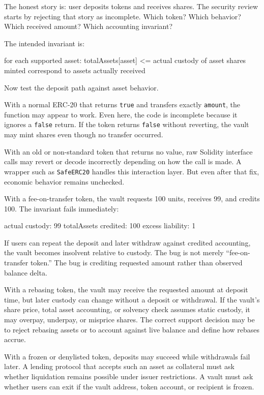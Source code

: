 The honest story is: user deposits tokens and receives shares. The security review starts by rejecting that story as incomplete. Which token? Which behavior? Which received amount? Which accounting invariant?

The intended invariant is:

\begin{codeblock}
for each supported asset:
    totalAssets[asset] <= actual custody of asset
    shares minted correspond to assets actually received
\end{codeblock}

Now test the deposit path against asset behavior.

With a normal ERC-20 that returns \texttt{true} and transfers exactly \texttt{amount}, the function may appear to work. Even here, the code is incomplete because it ignores a \texttt{false} return. If the token returns \texttt{false} without reverting, the vault may mint shares even though no transfer occurred.

With an old or non-standard token that returns no value, raw Solidity interface calls may revert or decode incorrectly depending on how the call is made. A wrapper such as \texttt{SafeERC20} handles this interaction layer. But even after that fix, economic behavior remains unchecked.

With a fee-on-transfer token, the vault requests 100 units, receives 99, and credits 100. The invariant fails immediately:

\begin{codeblock}
actual custody:       99
totalAssets credited: 100
excess liability:      1
\end{codeblock}

If users can repeat the deposit and later withdraw against credited accounting, the vault becomes insolvent relative to custody. The bug is not merely ``fee-on-transfer token.'' The bug is crediting requested amount rather than observed balance delta.

With a rebasing token, the vault may receive the requested amount at deposit time, but later custody can change without a deposit or withdrawal. If the vault's share price, total asset accounting, or solvency check assumes static custody, it may overpay, underpay, or misprice shares. The correct support decision may be to reject rebasing assets or to account against live balance and define how rebases accrue.

With a frozen or denylisted token, deposits may succeed while withdrawals fail later. A lending protocol that accepts such an asset as collateral must ask whether liquidation remains possible under issuer restrictions. A vault must ask whether users can exit if the vault address, token account, or recipient is frozen.

